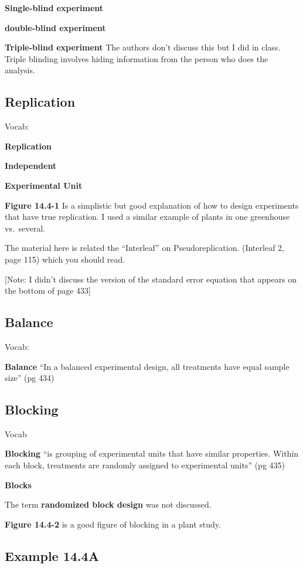 \documentclass[]{book}
\theoremstyle{definition}
\theoremstyle{definition}
\theoremstyle{definition}
\theoremstyle{remark}
\begin{document}
\textbf{Single-blind experiment}

\textbf{double-blind experiment}

\textbf{Triple-blind experiment} The authors don't discuss this but I
did in class. Triple blinding involves hiding information from the
person who does the analysis.

\subsection{Replication}\label{replication}

Vocab:

\textbf{Replication}

\textbf{Independent}

\textbf{Experimental Unit}

\textbf{Figure 14.4-1} Is a simplistic but good explanation of how to
design experiments that have true replication. I used a similar example
of plants in one greenhouse vs.~several.

The material here is related the ``Interleaf'' on Pseudoreplication.
(Interleaf 2, page 115) which you should read.

{[}Note: I didn't discuss the version of the standard error equation
that appears on the bottom of page 433{]}

\subsection{Balance}\label{balance}

Vocab:

\textbf{Balance} ``In a balanced experimental design, all treatments
have equal sample size'' (pg 434)

\subsection{Blocking}\label{blocking}

Vocab

\textbf{Blocking} ``is grouping of experimental units that have similar
properties. Within each block, treatments are randomly assigned to
experimental units'' (pg 435)

\textbf{Blocks}

The term \textbf{randomized block design} was not discussed.

\textbf{Figure 14.4-2} is a good figure of blocking in a plant study.

\subsection{Example 14.4A}\label{example-14.4a}
\end{document}
